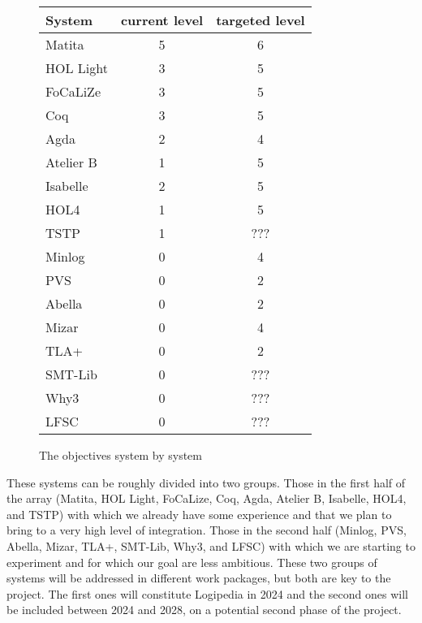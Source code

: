 \begin{figure}[t]
\begin{center}
\begin{tabular}{|l|c|c|}
\hline
System & current level & targeted level\\
\hline
{\sf Matita} & 5 & 6\\
\hline
{\sf HOL Light} & 3 & 5\\
\hline
{\sf FoCaLiZe} & 3 & 5\\
\hline
{\sf Coq} & 3 & 5\\
\hline
{\sf Agda} & 2 & 4\\
\hline
{\sf Atelier B} & 1 & 5\\
\hline
{\sf Isabelle} & 2 & 5\\
\hline
{\sf HOL4} & 1 & 5\\
\hline
{\sf TSTP} & 1 & {\color{red} ???}\\
\hline
{\sf Minlog} & 0 & 4\\
\hline
{\sf PVS} & 0 & 2\\
\hline
{\sf Abella} & 0 & 2\\
\hline
{\sf Mizar} & 0 & 4\\
\hline
{\sf TLA+} & 0 & 2\\
\hline
{\sf SMT-Lib} & 0 & {\color{red} ???}\\
\hline
{\sf Why3} & 0 & {\color{red} ???}\\
\hline
{\sf LFSC} & 0 & {\color{red} ???}\\
\hline
\end{tabular}
\end{center}
\caption{The objectives system by system \label{objectives}}
\end{figure}

These systems can be roughly divided into two groups. Those in the
first half of the array ({\sf Matita}, {\sf HOL Light}, {\sf
  FoCaLize}, {\sf Coq}, {\sf Agda}, {\sf Atelier B}, {\sf Isabelle},
{\sf HOL4}, and {\sf TSTP}) with which we already have some experience
and that we plan to bring to a very high level of integration. Those
in the second half ({\sf Minlog}, {\sf PVS}, {\sf Abella}, {\sf
  Mizar}, {\sf TLA+}, {\sf SMT-Lib}, {\sf Why3}, and {\sf LFSC}) with
which we are starting to experiment and for which our goal are less
ambitious.  These two groups of systems will be addressed in different
work packages, but both are key to the project. The first ones will
constitute {\sf Logipedia} in 2024 and the second ones will be
included between 2024 and 2028, on a potential second phase of the
project.


